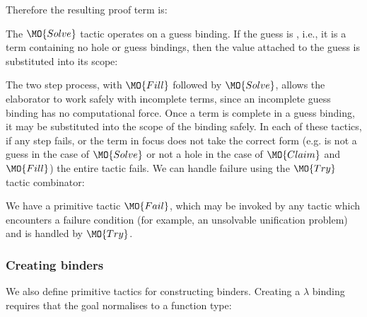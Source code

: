 \noindent
Therefore the resulting proof term is:


The $\MO{Solve}$ tactic operates on a guess binding. If the guess is , i.e., it
is a \TT{} term containing no hole or guess bindings, then the value attached to
the guess is substituted into its scope:


The two step process, with $\MO{Fill}$ followed by $\MO{Solve}$, allows the elaborator
to work safely with incomplete terms, since an incomplete guess binding has no 
computational force. Once a term is complete in a guess binding, it may be substituted into the 
scope of the binding safely.
In each of these tactics, if any step fails, or the term in focus does not take
the correct form (e.g. is not a guess in the case of $\MO{Solve}$ or not a hole
in the case of $\MO{Claim}$ and $\MO{Fill}$) the entire tactic fails. We can
handle failure using the $\MO{Try}$ tactic combinator:


We have a primitive tactic $\MO{Fail}$, which may be invoked by
any tactic which encounters a failure condition (for example, an unsolvable unification
problem) and is handled by $\MO{Try}$.

\subsubsection{Creating binders}

We also define primitive tactics for constructing binders. Creating a $\lambda$
binding requires that the goal normalises to a function type:


